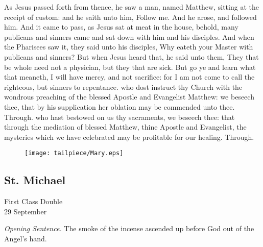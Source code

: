  As Jesus passed forth from thence, he saw a man, named Matthew, sitting at the receipt of custom: and he saith unto him, Follow me. And he arose, and followed him. And it came to pass, as Jesus sat at meat in the house, behold, many publicans and sinners came and sat down with him and his disciples. And when the Pharisees saw it, they said unto his disciples, Why eateth your Master with publicans and sinners? But when Jesus heard that, he said unto them, They that be whole need not a physician, but they that are sick. But go ye and learn what that meaneth, I will have mercy, and not sacrifice: for I am not come to call the righteous, but sinners to repentance.
\secret
{} who dost instruct thy Church with the wondrous preaching of the blessed Apostle and Evangelist Matthew: we beseech thee, that by his supplication her oblation may be commended unto thee. Through.
\postcommunion
{} who hast bestowed on us thy sacraments, we beseech thee: that through the mediation of blessed Matthew, thine Apostle and Evangelist, the mysteries which we have celebrated may be profitable for our healing. Through.


\vfill

  \begin{figure}[H]
  	\centering
  	\texttt{[image: tailpiece/Mary.eps]}
  \end{figure}
  
\clearpage
\subsection{St. Michael}
\begin{inhead}
    {First Class Double\\
29 September}
\end{inhead}
\par\noindent
\textit{Opening Sentence.} The smoke of the incense ascended up before God out of the Angel's hand.

